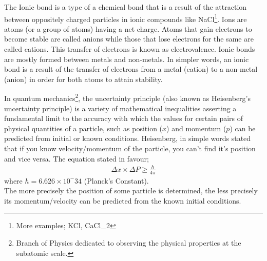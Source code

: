 \begin{chembox}{}
{The {Ionic bond} is a type of a {chemical bond} that is a result of the attraction {between oppositely charged particles} in ionic compounds like NaCl\footnote{More examples; KCl, CaCl_2}. Ions are atoms (or a group of atoms) having a {net charge}. Atoms that {gain electrons} to become {stable} are called {anions} while those that {lose electrons} for the same are called {cations}. This {transfer of electrons} is known as {electrovalence}. Ionic bonds are {mostly} formed {between metals and non-metals}. In simpler words, an ionic bond is a result of the transfer of electrons from a metal (cation) to a non-metal (anion) in order for both atoms to attain stability.}
\end{chembox}
\begin{phybox}{}
{In quantum mechanics\footnote{Branch of Physics dedicated to observing the physical properties at the subatomic scale.}, the uncertainty principle (also known as Heisenberg's uncertainty principle) is a variety of mathematical inequalities asserting a fundamental limit to the accuracy with which the values for certain pairs of physical quantities of a particle, such as position ($x$) and momentum ($p$) can be predicted from initial or known conditions. Heisenberg, in simple words stated that if you know velocity/momentum of the particle, you can't find it's position and vice versa. The equation stated in favour;
\begin{align*}
    \Delta x \times \Delta P \geq \frac{h}{4\pi}
\end{align*}
where  $h = 6.626 \times 10^-34$ (Planck's Constant).\\
The more precisely the position of some particle is determined, the less precisely its momentum/velocity can be predicted from the known initial conditions.}
\end{phybox}
